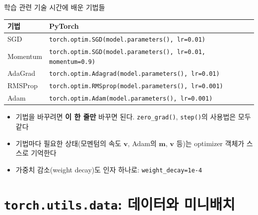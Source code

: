 \documentclass[aspectratio=169,11pt]{beamer}
\newcommand{\vect}[1]{\bm{#1}}
\newcommand{\code}[1]{\texttt{#1}}
\begin{document}
\begin{frame}{학습 관련 기술 시간에 배운 기법들}
\centering
\small
\renewcommand{\arraystretch}{1.3}
\begin{tabular}{ll}
\toprule
\textbf{기법} & \textbf{PyTorch} \\
\midrule
SGD & \code{torch.optim.SGD(model.parameters(), lr=0.01)} \\
Momentum & \code{torch.optim.SGD(model.parameters(), lr=0.01, momentum=0.9)} \\
AdaGrad & \code{torch.optim.Adagrad(model.parameters(), lr=0.01)} \\
RMSProp & \code{torch.optim.RMSprop(model.parameters(), lr=0.001)} \\
Adam & \code{torch.optim.Adam(model.parameters(), lr=0.001)} \\
\bottomrule
\end{tabular}
\vskip3mm
\raggedright
\begin{itemize}
\item 기법을 바꾸려면 \textbf{이 한 줄만} 바꾸면 된다. \code{zero\_grad()}, \code{step()}의 사용법은 모두 같다
\item 기법마다 필요한 상태(모멘텀의 속도 $\vect v$, Adam의 $\vect m$, $\vect v$ 등)는 optimizer 객체가 스스로 기억한다
\item 가중치 감소(weight decay)도 인자 하나로: \code{weight\_decay=1e-4}
\end{itemize}
\end{frame}

\section{\texttt{torch.utils.data}: 데이터와 미니배치}
\end{document}
